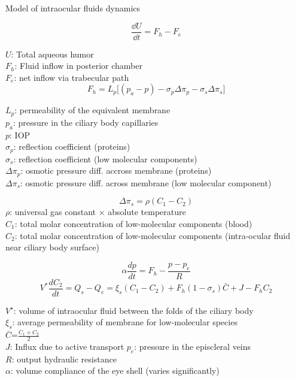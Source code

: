 \begin{frame}{Model of intraocular fluids dynamics}
\begin{block}{}
\[
\frac{\dd U}{\dd t}=F_{h}-F_{e}
\]
\end{block}

\small{$U$: Total aqueous humor\\
$F_h$: Fluid inflow in posterior chamber\\
$F_e$: net inflow via trabecular path}
\newline
\[
F_{h}= L_p \big[ (p_a-p)-\sigma_{p} \Delta\pi_{p}-\sigma_{s} \Delta\pi_{s}\big]
\]


\small{
$L_p$: permeability of the equivalent membrane\\
$p_a$: pressure in the ciliary body capillaries\\
$p$: IOP \\
$\sigma_p$: reflection coefficient (proteins)\\
$\sigma_s$: reflection coefficient (low molecular components)\\
$\Delta \pi_p $: osmotic pressure diff. accross membrane (proteins)\\
$\Delta \pi_s $: osmotic pressure diff. across membrane (low molecular component)}

\end{frame}
\begin{frame}
\[
\Delta\pi_{s}= \rho(C_1-C_{2}) 
\]
\small{$\rho$: universal gas constant $\times$  absolute temperature\\
$C_1$: total molar concentration of low-molecular components (blood)\\
$C_2$: total molar concentration of low-molecular components (intra-ocular fluid near ciliary body surface) }
\newline
\\
\begin{block}{}
\[
 \alpha \frac{dp}{dt}=F_{h}-\frac{p-p_e}{R}
 \]
\[
 V^{\ast} \frac{dC_{2}}{dt}= Q_s-Q_e=\xi_s(C_1-C_{2})+F_h (1-\sigma_s) \bar{C}+J-F_h C_2
 \]
\end{block}
\small{
$V^\star$: volume of intraocular fluid between the folds of the ciliary body\\
$\xi_s$: average permeability of membrane for low-molecular species\\
$\overline{C}$=$\displaystyle{\frac{C_1+C_2}{2}}$\\
$J$: Influx due to active transport
$p_e$: pressure in the episcleral veins\\
$R$: output hydraulic resistance\\
$\alpha$: volume compliance of the eye shell (varies significantly)}

\end{frame}

